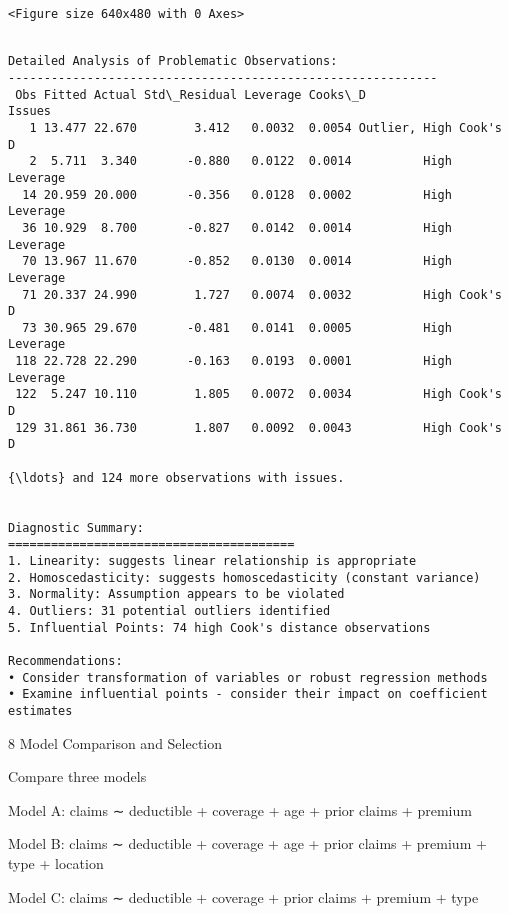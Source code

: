 \documentclass[8pt, twocolumn]{extarticle}
\begin{document}
    
    \begin{Verbatim}[commandchars=\\\{\}]
<Figure size 640x480 with 0 Axes>
    \end{Verbatim}

    
    \begin{Verbatim}[commandchars=\\\{\}]

Detailed Analysis of Problematic Observations:
------------------------------------------------------------
 Obs Fitted Actual Std\_Residual Leverage Cooks\_D                 Issues
   1 13.477 22.670        3.412   0.0032  0.0054 Outlier, High Cook's D
   2  5.711  3.340       -0.880   0.0122  0.0014          High Leverage
  14 20.959 20.000       -0.356   0.0128  0.0002          High Leverage
  36 10.929  8.700       -0.827   0.0142  0.0014          High Leverage
  70 13.967 11.670       -0.852   0.0130  0.0014          High Leverage
  71 20.337 24.990        1.727   0.0074  0.0032          High Cook's D
  73 30.965 29.670       -0.481   0.0141  0.0005          High Leverage
 118 22.728 22.290       -0.163   0.0193  0.0001          High Leverage
 122  5.247 10.110        1.805   0.0072  0.0034          High Cook's D
 129 31.861 36.730        1.807   0.0092  0.0043          High Cook's D

{\ldots} and 124 more observations with issues.


Diagnostic Summary:
========================================
1. Linearity: suggests linear relationship is appropriate
2. Homoscedasticity: suggests homoscedasticity (constant variance)
3. Normality: Assumption appears to be violated
4. Outliers: 31 potential outliers identified
5. Influential Points: 74 high Cook's distance observations

Recommendations:
• Consider transformation of variables or robust regression methods
• Examine influential points - consider their impact on coefficient estimates
    \end{Verbatim}

    8 Model Comparison and Selection

Compare three models

Model A: claims ∼ deductible + coverage + age + prior claims + premium

Model B: claims ∼ deductible + coverage + age + prior claims + premium +
type + location

Model C: claims ∼ deductible + coverage + prior claims + premium + type
\end{document}
